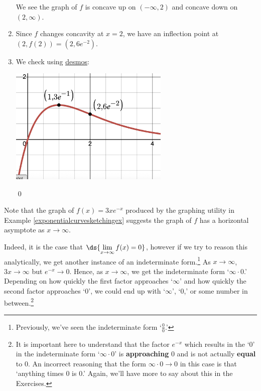 \documentclass{ximera}
\begin{document}
\begin{example}
\begin{enumerate}
\begin{center}
\begin{multicols}{2}
\end{multicols}
\end{center}

We see the graph of $f$ is concave up on $(-\infty, 2)$ and concave down on $(2, \infty)$.

\medskip

\item  Since $f$ changes concavity at $x=2$, we have an inflection point at $(2, f(2)) = \left( 2, 6e^{-2} \right)$.

\bigskip

\item We check using \href{https://www.desmos.com/calculator}{\underline{desmos}}:

\bigskip

\centerline{ \includegraphics[width=3in]{./ExponentialEquationsandInequalitiesGraphics/ExpCurveSketchingExample.png}}

\hfill \qed

\end{enumerate}


\end{example}

Note that the graph of $f(x) = 3xe^{-x}$ produced by the graphing utility in  Example \ref{exponentialcurvesketchingex} suggests the graph of $f$ has a horizontal asymptote as $x \rightarrow \infty$.

\medskip

Indeed, it is the case that $\ds{\lim_{x \rightarrow \infty} f(x) = 0}$, however if we try to reason this analytically, we get another instance of an indeterminate form.\footnote{Previously, we've seen the indeterminate form `$\frac{0}{0}$.'}  As $x \rightarrow \infty$, $3x \rightarrow \infty$ but $e^{-x} \rightarrow 0$.  Hence, as $x \rightarrow \infty$, we get the indeterminate form `$\infty \cdot 0$.' Depending on how quickly the first factor approaches `$\infty$' and how quickly the second factor approaches `$0$', we could end up with `$\infty$', `$0$,' or some number in between.\footnote{It is important here to understand that the factor  $e^{-x}$ which results in the `$0$' in the indeterminate form  `$\infty \cdot 0$' is \textbf{approaching} $0$ and is not actually \textbf{equal} to $0$.  An incorrect reasoning that  the form $\infty \cdot 0 \rightarrow 0$ in this case is that `anything times $0$ is $0$.'  Again, we'll have more to say about this in the Exercises.}
\end{document}
